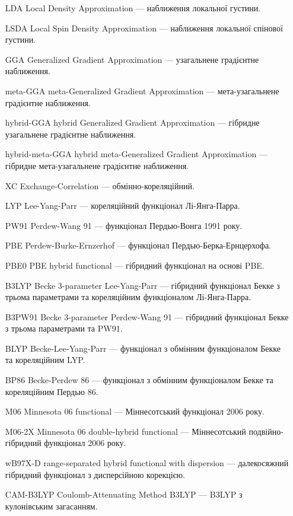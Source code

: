 \begin{enumerate}[
    leftmargin=10em,
    font=\bfseries,   %
    labelindent=5em,%
    leftmargin=*,     %
]
    \item[LDA] Local Density Approximation --- наближення локальної густини.
    \item[LSDA] Local Spin Density Approximation --- наближення локальної спінової густини.
    \item[GGA] Generalized Gradient Approximation --- узагальнене градієнтне наближення.
    \item[meta-GGA] meta-Generalized Gradient Approximation --- мета-узагальнене градієнтне наближення.
    \item[hybrid-GGA] hybrid Generalized Gradient Approximation --- гібридне узагальнене градієнтне наближення.
    \item[hybrid-meta-GGA] hybrid meta-Generalized Gradient Approximation --- гібридне мета-узагальнене градієнтне наближення.

    \item[XC] Exchange-Correlation --- обмінно-кореляційний.
    \item[LYP] Lee-Yang-Parr --- кореляційний функціонал Лі-Янга-Парра.
    \item[PW91] Perdew-Wang 91 --- функціонал Пердью-Вонга 1991 року.
    \item[PBE] Perdew-Burke-Ernzerhof --- функціонал Пердью-Берка-Ернцерхофа.
    \item[PBE0] PBE hybrid functional --- гібридний функціонал на основі PBE.
    \item[B3LYP] Becke 3-parameter Lee-Yang-Parr --- гібридний функціонал Бекке з трьома параметрами та кореляційним функціоналом Лі-Янга-Парра.
    \item[B3PW91] Becke 3-parameter Perdew-Wang 91 --- гібридний функціонал Бекке з трьома параметрами та PW91.
    \item[BLYP] Becke-Lee-Yang-Parr --- функціонал з обмінним функціоналом Бекке та кореляційним LYP.
    \item[BP86] Becke-Perdew 86 --- функціонал з обмінним функціоналом Бекке та кореляційним Пердью 86.
    \item[M06] Minnesota 06 functional --- Міннесотський функціонал 2006 року.
    \item[M06-2X] Minnesota 06 double-hybrid functional --- Міннесотський подвійно-гібридний функціонал 2006 року.
    \item[wB97X-D] range-separated hybrid functional with dispersion --- далекосяжний гібридний функціонал з дисперсійною корекцією.
    \item[CAM-B3LYP] Coulomb-Attenuating Method B3LYP --- B3LYP з кулонівським загасанням.


\end{enumerate}
